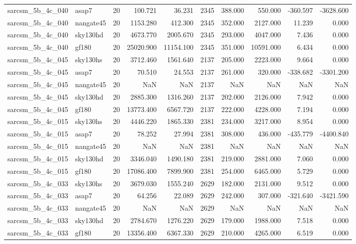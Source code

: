 \documentclass{article}
\begin{document}
\begin{longtable}{llrrrrrrrr}
sarcsm\_5b\_4c\_040 & asap7 & 20 & 100.721 & 36.231 & 2345 & 388.000 & 550.000 & -360.597 & -3628.600 \\
sarcsm\_5b\_4c\_040 & nangate45 & 20 & 1153.280 & 412.300 & 2345 & 352.000 & 2127.000 & 11.239 & 0.000 \\
sarcsm\_5b\_4c\_040 & sky130hd & 20 & 4673.770 & 2005.670 & 2345 & 293.000 & 4047.000 & 7.436 & 0.000 \\
sarcsm\_5b\_4c\_040 & gf180 & 20 & 25020.900 & 11154.100 & 2345 & 351.000 & 10591.000 & 6.434 & 0.000 \\
sarcsm\_5b\_4c\_045 & sky130hs & 20 & 3712.460 & 1561.640 & 2137 & 205.000 & 2223.000 & 9.664 & 0.000 \\
sarcsm\_5b\_4c\_045 & asap7 & 20 & 70.510 & 24.553 & 2137 & 261.000 & 320.000 & -338.682 & -3301.200 \\
sarcsm\_5b\_4c\_045 & nangate45 & 20 & NaN & NaN & 2137 & NaN & NaN & NaN & NaN \\
sarcsm\_5b\_4c\_045 & sky130hd & 20 & 2885.300 & 1316.260 & 2137 & 202.000 & 2126.000 & 7.942 & 0.000 \\
sarcsm\_5b\_4c\_045 & gf180 & 20 & 13773.400 & 6567.720 & 2137 & 222.000 & 4228.000 & 7.194 & 0.000 \\
sarcsm\_5b\_4c\_015 & sky130hs & 20 & 4446.220 & 1865.330 & 2381 & 234.000 & 3217.000 & 8.954 & 0.000 \\
sarcsm\_5b\_4c\_015 & asap7 & 20 & 78.252 & 27.994 & 2381 & 308.000 & 436.000 & -435.779 & -4400.840 \\
sarcsm\_5b\_4c\_015 & nangate45 & 20 & NaN & NaN & 2381 & NaN & NaN & NaN & NaN \\
sarcsm\_5b\_4c\_015 & sky130hd & 20 & 3346.040 & 1490.180 & 2381 & 219.000 & 2881.000 & 7.060 & 0.000 \\
sarcsm\_5b\_4c\_015 & gf180 & 20 & 17086.400 & 7899.900 & 2381 & 254.000 & 6465.000 & 5.729 & 0.000 \\
sarcsm\_5b\_4c\_033 & sky130hs & 20 & 3679.030 & 1555.240 & 2629 & 182.000 & 2131.000 & 9.512 & 0.000 \\
sarcsm\_5b\_4c\_033 & asap7 & 20 & 64.256 & 22.089 & 2629 & 242.000 & 307.000 & -321.640 & -3421.590 \\
sarcsm\_5b\_4c\_033 & nangate45 & 20 & NaN & NaN & 2629 & NaN & NaN & NaN & NaN \\
sarcsm\_5b\_4c\_033 & sky130hd & 20 & 2784.670 & 1276.220 & 2629 & 179.000 & 1988.000 & 7.518 & 0.000 \\
sarcsm\_5b\_4c\_033 & gf180 & 20 & 13356.400 & 6367.330 & 2629 & 210.000 & 4265.000 & 6.519 & 0.000 \\

\end{longtable}
\end{document}
